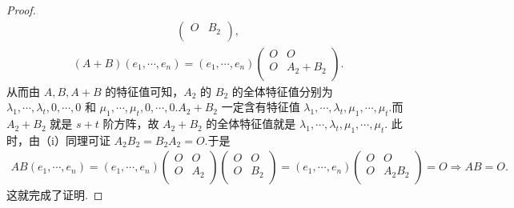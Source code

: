 \documentclass[../../main.tex]{subfiles}%
\begin{document}
\begin{proof}
\begin{align*}
\begin{pmatrix}
O&		B_2\\
\end{pmatrix},
\end{align*}
\begin{align*}
\left( A+B \right) \left( e_1,\cdots ,e_n \right) =\left( e_1,\cdots ,e_n \right) \begin{pmatrix}
O&		O\\
O&		A_2+B_2\\
\end{pmatrix}.
\end{align*}
从而由 $A,B,A+B$ 的特征值可知，$A_2$ 的 $B_2$ 的全体特征值分别为 $\lambda _1,\cdots ,\lambda _t,0,\cdots ,0$ 和 $\mu _1,\cdots ,\mu _t,0,\cdots ,0$.$A_2+B_2$ 一定含有特征值 $\lambda _1,\cdots ,\lambda _t,\mu _1,\cdots ,\mu _t$.而 $A_2+B_2$ 就是 $s+t$ 阶方阵，故 $A_2+B_2$ 的全体特征值就是 $\lambda _1,\cdots ,\lambda _t,\mu _1,\cdots ,\mu _t$.
此时，由（i）同理可证 $A_2B_2=B_2A_2=O$.于是
\begin{align*}
AB\left( e_1,\cdots ,e_n \right) =\left( e_1,\cdots ,e_n \right) \begin{pmatrix}
O&		O\\
O&		A_2\\
\end{pmatrix} \begin{pmatrix}
O&		O\\
O&		B_2\\
\end{pmatrix} =\left( e_1,\cdots ,e_n \right) \begin{pmatrix}
O&		O\\
O&		A_2B_2\\
\end{pmatrix} =O\Rightarrow AB=O.
\end{align*}
这就完成了证明.

\end{proof}
\end{document}
